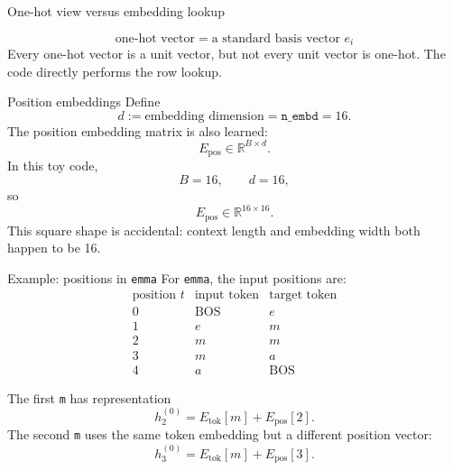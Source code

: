 \documentclass[
  xcolor={svgnames,dvipsnames},
  hyperref={pagebackref,bookmarks},
  aspectratio=169,
  11pt
]{beamer}
\begin{document}
\begin{frame}{One-hot view versus embedding lookup}
\centering
{}

\vspace{0.35cm}
\[
\boxed{\text{one-hot vector}=\text{a standard basis vector }e_i}
\]
Every one-hot vector is a unit vector, but not every unit vector is one-hot. The code directly performs the row lookup.
\end{frame}

\begin{frame}{Position embeddings}
Define
\[
\boxed{d:=\text{embedding dimension}=\texttt{n\_embd}=16.}
\]
The position embedding matrix is also learned:
\[
E_{\mathrm{pos}}\in\mathbb R^{B\times d}.
\]
In this toy code,
\[
B=16,\qquad d=16,
\]
so
\[
E_{\mathrm{pos}}\in\mathbb R^{16\times16}.
\]
This square shape is accidental: context length and embedding width both happen to be 16.
\end{frame}

\begin{frame}{Example: positions in \texttt{emma}}
For \texttt{emma}, the input positions are:
\[
\begin{array}{c|c|c}
\text{position }t & \text{input token} & \text{target token}\\\hline
0 & \mathrm{BOS} & e\\
1 & e & m\\
2 & m & m\\
3 & m & a\\
4 & a & \mathrm{BOS}
\end{array}
\]

The first \texttt{m} has representation
\[
h_2^{(0)}=E_{\mathrm{tok}}[m]+E_{\mathrm{pos}}[2].
\]
The second \texttt{m} uses the same token embedding but a different position vector:
\[
h_3^{(0)}=E_{\mathrm{tok}}[m]+E_{\mathrm{pos}}[3].
\]
\end{frame}
\end{document}
